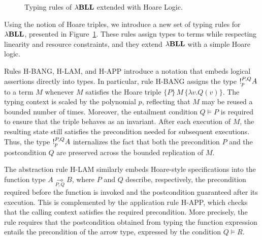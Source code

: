\begin{figure}[htpb]
\begin{center}
{
}
\end{center}
\caption{Typing rules of ${\lambda}\mathbf{BLL}$ extended with Hoare Logic.}
\label{fig:hl-typing-rules}
\end{figure}

Using the notion of Hoare triples, we introduce a new set of typing rules for ${\lambda}\mathbf{BLL}$, 
presented in Figure~\ref{fig:hl-typing-rules}. These rules assign types to terms 
while respecting linearity and resource constraints, and they extend ${\lambda}\mathbf{BLL}$ 
with a simple Hoare logic. 

Rules H-BANG, H-LAM, and H-APP introduce a notation that embeds logical assertions directly into types. In particular, rule H-BANG assigns the type $\mathord{!}_p^{P,Q} A$ to a term $M$ whenever $M$ satisfies the Hoare triple $\{P\}\, M \,\{\lambda v. Q(v)\}$. The typing context is scaled by the polynomial $p$, reflecting that $M$ may be reused a bounded number of times. Moreover, the entailment condition $Q \models P$ is required to ensure that the triple behaves as an invariant. After each execution of $M$, the resulting state still satisfies the precondition needed for subsequent executions. Thus, the type $\mathord{!}_p^{P,Q} A$ internalizes the fact that both the precondition $P$ and the postcondition $Q$ are preserved across the bounded replication of $M$.

The abstraction rule H-LAM similarly embeds Hoare-style specifications into the function type $A \underset{P,Q}{\multimap} B$, where $P$ and $Q$ describe, respectively, the precondition required before the function is invoked and the postcondition guaranteed after its execution. This is complemented by the application rule H-APP, which checks that the calling context satisfies the required precondition. More precisely, the rule requires that the postcondition obtained from typing the function expression entails the precondition of the arrow type, expressed by the condition $Q \models R$.


